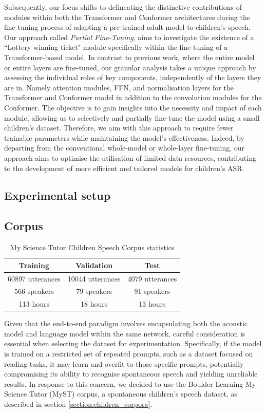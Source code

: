 Subsequently, our focus shifts to delineating the distinctive contributions of modules within both the Transformer and Conformer architectures during the fine-tuning process of adapting a pre-trained adult model to children's speech. Our approach called \textit{Partial Fine-Tuning}, aims to investigate the existence of a ``Lottery winning ticket" module specifically within the fine-tuning of a Transformer-based model.
In contrast to previous work, where the entire model or entire layers are fine-tuned, our granular analysis takes a unique approach by assessing the individual roles of key components, independently of the layers they are in. Namely attention modules, \ac{FFN}, and normalisation layers for the Transformer and Conformer model in addition to the convolution modules for the Conformer. The objective is to gain insights into the necessity and impact of each module, allowing us to selectively and partially fine-tune the model using a small children's dataset. Therefore, we aim with this approach to require fewer trainable parameters while maintaining the model's effectiveness. Indeed, by departing from the conventional whole-model or whole-layer fine-tuning, our approach aims to optimise the utilisation of limited data resources, contributing to the development of more efficient and tailored models for children's \ac{ASR}.


\subsection{Experimental setup}
\label{section:methods_chapter4}

\subsection{Corpus}
\begin{table}[h]
\centering
\begin{tabular}{c|c|c}
\hline
 Training & Validation     & Test   \\ \hline
60897 utterances  & 10044 utterances   & 4079 utterances \\ 
 566 speakers  & 79 speakers   & 91 speakers \\ 
 113 hours  & 18 hours   & 13 hours \\ \hline

\end{tabular}
\caption{My Science Tutor Children Speech Corpus statistics}
\label{tab:statistics_myst}
\end{table}
Given that the end-to-end paradigm involves encapsulating both the acoustic model and language model within the same network, careful consideration is essential when selecting the dataset for experimentation. Specifically, if the model is trained on a restricted set of repeated prompts, such as a dataset focused on reading tasks, it may learn and overfit to those specific prompts, potentially compromising its ability to recognise spontaneous speech and yielding unreliable results. In response to this concern, we decided to use the Boulder Learning My Science Tutor (MyST) corpus, a spontaneous children's speech dataset, as described in section \ref{section:children_corpora}. 

